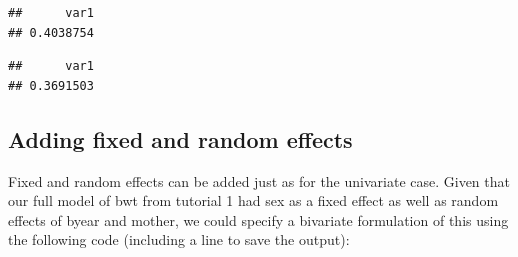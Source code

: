 \documentclass[
  12pt,
]{book}
\newenvironment{Shaded}{\begin{snugshade}}{\end{snugshade}}
\newcommand{\FloatTok}[1]{\textcolor[rgb]{0.00,0.00,0.81}{#1}}
\newcommand{\FunctionTok}[1]{\textcolor[rgb]{0.00,0.00,0.00}{#1}}
\newcommand{\NormalTok}[1]{#1}
\newcommand{\OtherTok}[1]{\textcolor[rgb]{0.56,0.35,0.01}{#1}}
\newcommand{\SpecialCharTok}[1]{\textcolor[rgb]{0.00,0.00,0.00}{#1}}
\newcommand{\StringTok}[1]{\textcolor[rgb]{0.31,0.60,0.02}{#1}}
\begin{document}
\begin{verbatim}
##      var1 
## 0.4038754
\end{verbatim}

\begin{Shaded}
\end{Shaded}

\begin{verbatim}
##      var1 
## 0.3691503
\end{verbatim}

\hypertarget{adding-fixed-and-random-effects-1}{%
\subsection{Adding fixed and random effects}\label{adding-fixed-and-random-effects-1}}

Fixed and random effects can be added just as for the univariate case.
Given that our full model of bwt from tutorial 1 had sex as a fixed effect as well as random effects of byear and mother, we could specify a bivariate formulation of this using the following code (including a line to save the output):
\end{document}
